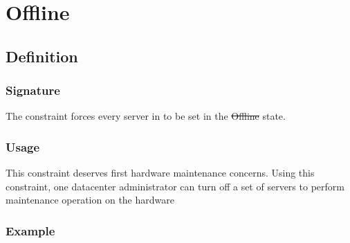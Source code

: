 \section{Offline}

\subsection{Definition}

\subsubsection{Signature} 

The  constraint forces every server in  to be set in the \st{Offline} state.

\subsubsection{Usage}

This constraint deserves first hardware maintenance concerns. Using this constraint, one datacenter administrator can turn off a set of servers to perform maintenance operation on the hardware


\subsubsection{Example}

